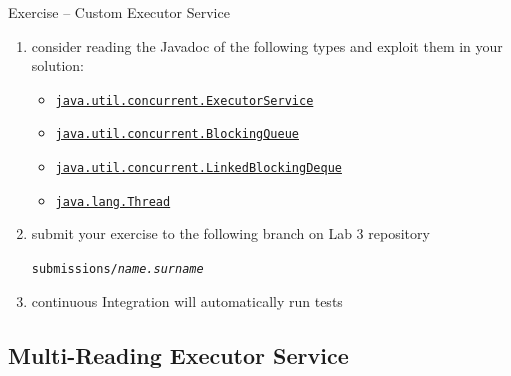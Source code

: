 \documentclass[presentation]{beamer}\mode<presentation>{\usetheme{AMSBolognaFC}}
\begin{document}
\begin{frame}[c,allowframebreaks]{Exercise \currentExercise{} -- Custom Executor Service}
\begin{enumerate}
		\item consider reading the Javadoc of the following types and exploit them in your solution:
		\begin{itemize}
			\item \href{https://docs.oracle.com/javase/8/docs/api/java/util/concurrent/ExecutorService.html}{\texttt{java.util.concurrent.ExecutorService}}
			\item \href{https://docs.oracle.com/javase/8/docs/api/java/util/concurrent/BlockingQueue.html}{\texttt{java.util.concurrent.BlockingQueue}}
			\item \href{https://docs.oracle.com/javase/8/docs/api/java/util/concurrent/LinkedBlockingDeque.html}{\texttt{java.util.concurrent.LinkedBlockingDeque}}
			\item \href{https://docs.oracle.com/javase/8/docs/api/java/lang/Thread.html}{\texttt{java.lang.Thread}}
		\end{itemize}

        \bigskip

        \item submit your exercise to the following branch on Lab 3 repository
        \begin{center}
            \texttt{submissions/\textit{name.surname}}
        \end{center}

        \bigskip

        \item continuous Integration will automatically run tests

	\end{enumerate}

\end{frame}

\startExercise

\subsection{Multi-Reading Executor Service}
\end{document}
